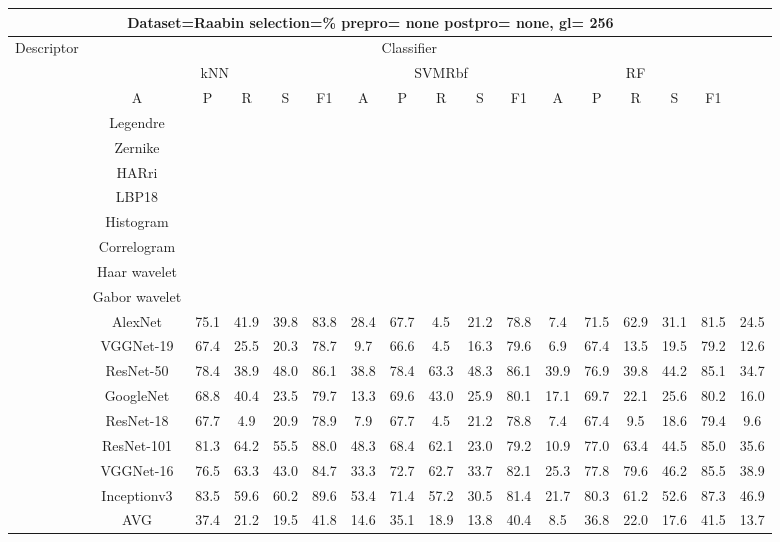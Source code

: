 \documentclass[12pt,italian]{article}
\begin{document}
\begin{tiny}
 \pagebreak 
\begin{longtable}{lcccccccccccccccc}
\toprule
\multicolumn{16}{c}{Dataset=Raabin selection=\% prepro= none postpro= none, gl= 256} \\ 
\toprule
Descriptor & \multicolumn{15}{c}{Classifier} \\ 
& \multicolumn{5}{c}{kNN} & \multicolumn{5}{c}{SVMRbf} & \multicolumn{5}{c}{RF} \\ 
& A & P & R & S & F1 & A & P & R & S & F1 & A & P & R & S & F1 \\ 
\midrule
& Legendre \\ 
& Zernike \\ 
& HARri \\ 
& LBP18 \\ 
& Histogram \\ 
& Correlogram \\ 
& Haar wavelet \\ 
& Gabor wavelet \\ 
& AlexNet & 75.1 & 41.9 & 39.8 & 83.8 & 28.4 & 67.7 &  4.5 & 21.2 & 78.8 &  7.4 & 71.5 & 62.9 & 31.1 & 81.5 & 24.5 \\ 
& VGGNet-19 & 67.4 & 25.5 & 20.3 & 78.7 &  9.7 & 66.6 &  4.5 & 16.3 & 79.6 &  6.9 & 67.4 & 13.5 & 19.5 & 79.2 & 12.6 \\ 
& ResNet-50 & 78.4 & 38.9 & 48.0 & 86.1 & 38.8 & 78.4 & 63.3 & 48.3 & 86.1 & 39.9 & 76.9 & 39.8 & 44.2 & 85.1 & 34.7 \\ 
& GoogleNet & 68.8 & 40.4 & 23.5 & 79.7 & 13.3 & 69.6 & 43.0 & 25.9 & 80.1 & 17.1 & 69.7 & 22.1 & 25.6 & 80.2 & 16.0 \\ 
& ResNet-18 & 67.7 &  4.9 & 20.9 & 78.9 &  7.9 & 67.7 &  4.5 & 21.2 & 78.8 &  7.4 & 67.4 &  9.5 & 18.6 & 79.4 &  9.6 \\ 
& ResNet-101 & 81.3 & 64.2 & 55.5 & 88.0 & 48.3 & 68.4 & 62.1 & 23.0 & 79.2 & 10.9 & 77.0 & 63.4 & 44.5 & 85.0 & 35.6 \\ 
& VGGNet-16 & 76.5 & 63.3 & 43.0 & 84.7 & 33.3 & 72.7 & 62.7 & 33.7 & 82.1 & 25.3 & 77.8 & 79.6 & 46.2 & 85.5 & 38.9 \\ 
& Inceptionv3 & 83.5 & 59.6 & 60.2 & 89.6 & 53.4 & 71.4 & 57.2 & 30.5 & 81.4 & 21.7 & 80.3 & 61.2 & 52.6 & 87.3 & 46.9 \\ 
\hline
& AVG & 37.4 & 21.2 & 19.5 & 41.8 & 14.6 & 35.1 & 18.9 & 13.8 & 40.4 &  8.5 & 36.8 & 22.0 & 17.6 & 41.5 & 13.7 \\ 
\hline
\bottomrule
\end{longtable} 

 \pagebreak 
\end{tiny} 
 
\end{document}
